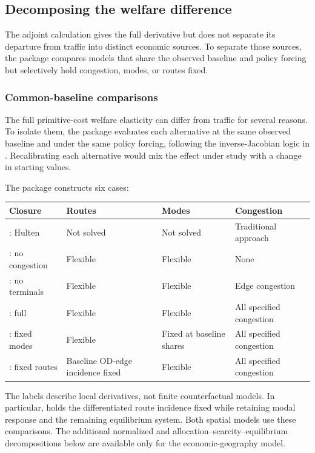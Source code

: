 \subsection{Decomposing the welfare difference}
\label{ch:decomposition}

The adjoint calculation gives the full derivative but does not separate its
departure from traffic into distinct economic sources. To separate those sources,
the package compares models that share the observed baseline and policy forcing
but selectively hold congestion, modes, or routes fixed.

\subsubsection{Common-baseline comparisons}

The full primitive-cost welfare elasticity can differ from traffic for several
reasons. To isolate them, the package evaluates each alternative at the same
observed baseline and under the same policy forcing, following the
inverse-Jacobian logic in \citet{FuchsWong2026Multimodal}. Recalibrating each
alternative would mix the effect under study with a change in starting values.

The package constructs six cases:
\begin{longtable}{L{0.18\textwidth}L{0.18\textwidth}L{0.22\textwidth}L{0.27\textwidth}}
\toprule
Closure & Routes & Modes & Congestion \\
\midrule
\endhead
{}: Hulten & Not solved & Not solved & Traditional approach \\
: no congestion & Flexible & Flexible & None \\
: no terminals & Flexible & Flexible & Edge congestion \\
: full & Flexible & Flexible & All specified congestion \\
: fixed modes & Flexible & Fixed at baseline shares & All specified congestion \\
: fixed routes & Baseline OD-edge incidence fixed & Flexible & All specified congestion \\
\bottomrule
\end{longtable}

The labels describe local derivatives, not finite counterfactual models. In
particular,  holds the differentiated route incidence fixed while
retaining modal response and the remaining equilibrium system. Both spatial
models use these comparisons. The additional normalized and
allocation--scarcity--equilibrium decompositions below are available only for
the economic-geography model.


